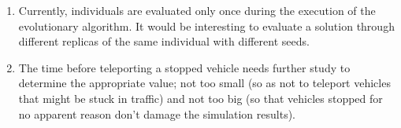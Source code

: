 \begin{enumerate}
    \item Currently, individuals are evaluated only once during the execution of the evolutionary algorithm. It would be interesting to evaluate a solution through different replicas of the same individual with different seeds.
    
    \item The time before teleporting a stopped vehicle needs further study to determine the appropriate value; not too small (so as not to teleport vehicles that might be stuck in traffic) and not too big (so that vehicles stopped for no apparent reason don't damage the simulation results).
\end{enumerate}